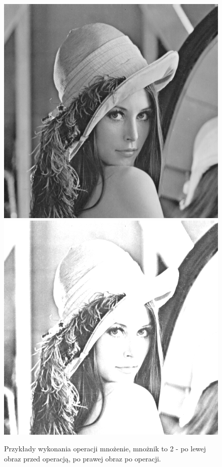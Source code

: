 \documentclass{article}
\begin{document}
\begin{figure}[!htb]
\centering
\includegraphics[scale=0.2]{img/lena_8bit.png} 
\includegraphics[scale=0.2]{img/_Mnozenie_Obrazka_lena_8bit.png}  
\caption{Przykłady wykonania operacji mnożenie, mnożnik to 2 - po lewej obraz przed operacją, po prawej obraz po operacji. }
\end{figure}
\end{document}
